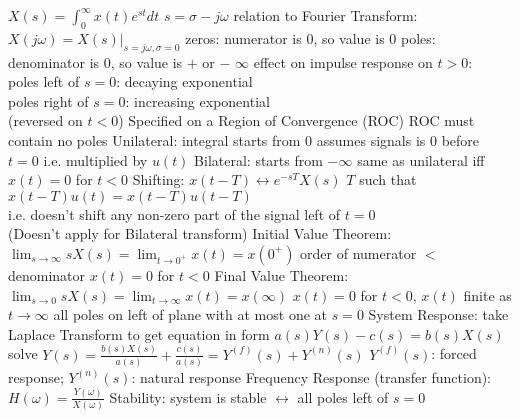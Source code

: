 \documentclass[12pt]{article}
\begin{document}
\begin{multicols*}{2}
\begin{flushleft}
\begin{outline}[longenum]
  \1 $X(s) = \int_{0}^{\infty} x(t) e^{st} dt$
  \1 $s = \sigma - j\omega$
  \1 relation to Fourier Transform: $X(j\omega)=X(s)|_{s=j\omega, \sigma=0}$
  \1 zeros: numerator is 0, so value is 0
  \1 poles: denominator is 0, so value is $+$ or $-$ $\infty$
    \2 effect on impulse response on $t>0$:
    \\ poles left of $s=0$: decaying exponential
    \\ poles right of $s=0$: increasing exponential
    \\ (reversed on $t<0$)
  \1 Specified on a Region of Convergence (ROC)
    \1 ROC must contain no poles
  \1 Unilateral: integral starts from 0
    \2 assumes signals is 0 before $t=0$ 
    \2 i.e. multiplied by $u(t)$
  \1 Bilateral: starts from $-\infty$
    \2 same as unilateral iff $x(t)=0$ for $t<0$
  \1 Shifting:
    \2 $x(t-T) \leftrightarrow e^{-sT}X(s)$
    \2 $T$ such that $x(t-T)u(t) = x(t-T)u(t-T)$
    \\ i.e. doesn't shift any non-zero part of the signal left of $t=0$
    \\ (Doesn't apply for Bilateral transform)
  \1 Initial Value Theorem:
    \2 $\lim_{s\to\infty}sX(s)=\lim_{t\to0^+}x(t)=x(0^+)$
    \2 order of numerator $<$ denominator
    \2 $x(t)=0$ for $t<0$
  \1 Final Value Theorem:
    \2 $\lim_{s\to0}sX(s)=\lim_{t\to\infty}x(t)=x(\infty)$
    \2 $x(t)=0$ for $t<0$, $x(t)$ finite as $t\to\infty$
    \2 all poles on left of plane with at most one at $s=0$
  \1 System Response:
    \2 take Laplace Transform to get equation in form $a(s)Y(s) - c(s) = b(s)X(s)$
    \2 solve $Y(s)=\frac{b(s)X(s)}{a(s)} + \frac{c(s)}{a(s)} = Y^{(f)}(s) + Y^{(n)}(s)$
    \2 $Y^{(f)}(s)$: forced response; $Y^{(n)}(s)$: natural response
    \2 Frequency Response (transfer function): $H(\omega)=\frac{Y(\omega)}{X(\omega)}$
  \1 Stability: system is stable $\leftrightarrow$ all poles left of $s=0$


\end{outline}
\end{flushleft}
\end{multicols*}
\end{document}
